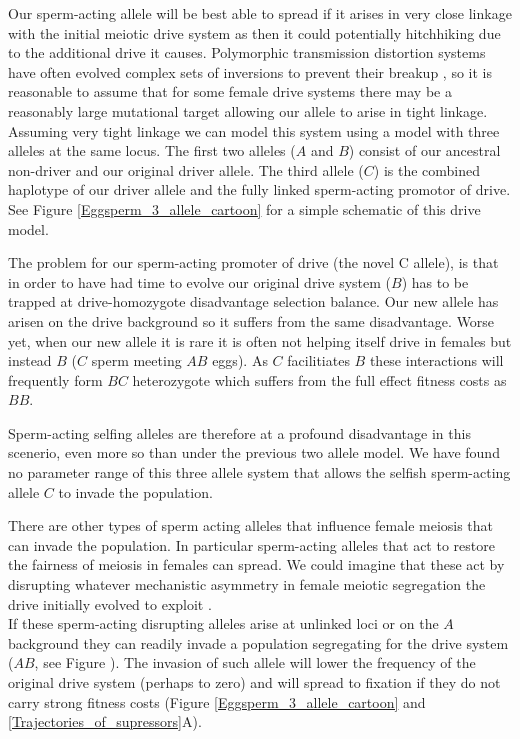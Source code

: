 \documentclass[12pt,letterpaper]{article}
\begin{document}
Our sperm-acting allele will be best able to spread if it arises in very close
linkage with the initial meiotic drive system as then it could potentially
hitchhiking due to the additional drive it causes. Polymorphic transmission distortion systems
have often evolved complex sets of inversions to prevent their breakup
\citep{XXX}, so it is reasonable to assume that for some female drive
systems there may be a reasonably large mutational target allowing our
allele to arise in tight linkage. Assuming very tight linkage we can
model this system using a model with three alleles at the same
locus. The first two alleles ($A$ and $B$) consist of our ancestral non-driver and
our original driver allele. The third allele ($C$) is the 
combined haplotype of our driver allele and the fully linked
sperm-acting promotor of drive.
 See Figure
\ref{Eggsperm_3_allele_cartoon} for a simple schematic of this drive model.  

The problem for our sperm-acting promoter of drive (the novel C
allele), is that in order to have had time to evolve our original
drive system ($B$) has to be trapped at drive-homozygote disadvantage selection balance. 
Our new allele has arisen on the drive background so it
suffers from the same disadvantage. 
Worse yet, when our new allele it is rare it is often not helping
itself drive in females but instead $B$ ($C$ sperm meeting $AB$ eggs).
As $C$ facilitiates $B$ these interactions will frequently form 
$BC$ heterozygote which suffers from the full
effect fitness costs as $BB$. 

Sperm-acting selfing alleles are therefore at a profound disadvantage
in this scenerio, even more so than under the previous two allele model.
We have found no parameter range of this
three allele system that allows the selfish sperm-acting allele $C$ to
invade the population. 

There are other types of sperm acting alleles that influence
female meiosis that can invade the population. 
In particular sperm-acting alleles that act to restore 
the fairness of meiosis in females can spread. 
We could imagine that these act by 
disrupting whatever mechanistic asymmetry in female meiotic segregation the
drive initially evolved to exploit \citep{Pardo-ManuelDeVillena2001a}.\\

If these sperm-acting disrupting alleles arise at unlinked loci or on
the $A$ background they can readily invade a population segregating
for the drive system ($AB$, see Figure ). The invasion of such allele
will lower the frequency of the original drive system (perhaps to zero)
and will spread to fixation if they do not carry strong fitness costs
(Figure \ref{Eggsperm_3_allele_cartoon} and \ref{Trajectories_of_supressors}A). \\
\end{document}
